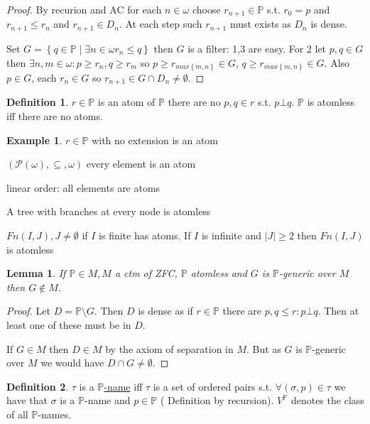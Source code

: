 \documentclass{scrartcl}
\renewcommand{\P}{\mathcal{P}}
\newcommand{\set}[1]{\left\{#1\right\}}
\theoremstyle{definition}
\newtheorem*{definition*}{Definition}
\newtheorem*{example*}{Example}
\theoremstyle{plain}
\newtheorem*{lemma*}{Lemma}
\theoremstyle{remark}
\begin{document}
 	\begin{proof}
 		By recurion and AC for each $n \in \omega$ choose $r_{n+1} \in \mathbb{P}$ s.t. $r_0 = p$ and $r_{n+1} \leq r_n$ and $r_{n+1} \in D_n$. At each step such
 		$r_{n+1}$ must exists as $D_n$ is dense.
 		
 		Set $G = \set{q \in \mathbb{P} \mid \exists n \in \omega r_n \leq q}$ then $G$ is a filter: 1,3 are easy. For 2 let $p, q \in G$ then
 		$\exists n,m \in \omega: p \geq r_n, q \geq r_m$ so $p \geq r_{max\set{m,n}} \in G$, $q \geq r_{max\set{m,n}} \in G$. Also $p \in G$, each $r_n \in G$ so $r_{n+1} \in G \cap D_n \neq \emptyset$.
 	\end{proof}
 
 	\begin{definition*}
 		$r \in \mathbb{P}$ is an atom of $\mathbb{P}$ there are no $p, q \in r$ s.t. $p \bot q$. $\mathbb{P}$ is atomless iff there are no atoms.
 	\end{definition*}
 
 	\begin{example*}
 		$r \in \mathbb{P}$ with no extension is an atom
 		
 		$(\P(\omega), \subseteq, \omega)$ every element is an atom
 		
 		linear order: all elements are atoms
 		
 		A tree with branches at every node is atomless
 		
 		$Fn(I, J), J \neq \emptyset$ if $I$ is finite has atoms. If $I$ is infinite and $|J| \geq 2$ then $Fn(I, J)$ is atomless
 	\end{example*}
 
 	\begin{lemma*}
 		If $\mathbb{P} \in M, M$ a ctm of ZFC, $\mathbb{P}$ atomless and $G$ is $\mathbb{P}$-generic over $M$ then $G \notin M$.
 	\end{lemma*}
 	
 	\begin{proof}
 		Let $D = \mathbb{P} \setminus G$. Then $D$ is dense as if $r \in \mathbb{P}$ there are $p, q \leq r: p \bot q$. Then at least one of these must be in $D$.
 		
 		If $G \in M$ then $D \in M$ by the axiom of separation in $M$. But as $G$ is $\mathbb{P}$-generic over $M$ we would have $D \cap G \neq \emptyset$. 
 	\end{proof}
 
 	\begin{definition*}
 		$\tau$ is a \underline{$\mathbb{P}$-name} iff $\tau$ is a set of ordered pairs s.t. $\forall (\sigma, p) \in \tau$ we have that $\sigma $ is a $\mathbb{P}$-name and $p \in \mathbb{P}$ ( Definition by recursion). $V^\mathbb{P}$ denotes the class of all $\mathbb{P}$-names.
 	\end{definition*}
 
\end{document}
